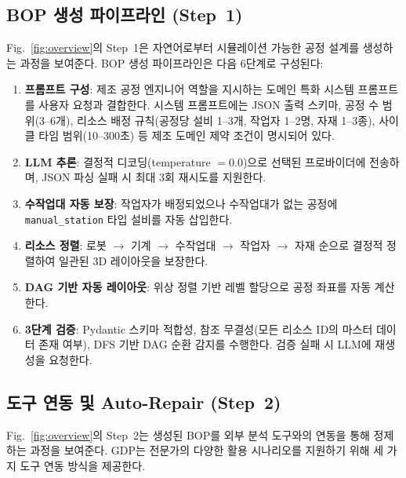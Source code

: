 \subsection{BOP 생성 파이프라인 (Step~1)}
\label{subsec:pipeline}

Fig.~\ref{fig:overview}의 Step~1은 자연어로부터 시뮬레이션 가능한 공정 설계를 생성하는 과정을 보여준다. BOP 생성 파이프라인은 다음 6단계로 구성된다:

\begin{enumerate}
    \item \textbf{프롬프트 구성}: 제조 공정 엔지니어 역할을 지시하는 도메인 특화 시스템 프롬프트를 사용자 요청과 결합한다. 시스템 프롬프트에는 JSON 출력 스키마, 공정 수 범위(3--6개), 리소스 배정 규칙(공정당 설비 1--3개, 작업자 1--2명, 자재 1--3종), 사이클 타임 범위(10--300초) 등 제조 도메인 제약 조건이 명시되어 있다.

    \item \textbf{LLM 추론}: 결정적 디코딩(temperature $= 0.0$)으로 선택된 프로바이더에 전송하며, JSON 파싱 실패 시 최대 3회 재시도를 지원한다.

    \item \textbf{수작업대 자동 보장}: 작업자가 배정되었으나 수작업대가 없는 공정에 \texttt{manual\_station} 타입 설비를 자동 삽입한다.

    \item \textbf{리소스 정렬}: 로봇 $\rightarrow$ 기계 $\rightarrow$ 수작업대 $\rightarrow$ 작업자 $\rightarrow$ 자재 순으로 결정적 정렬하여 일관된 3D 레이아웃을 보장한다.

    \item \textbf{DAG 기반 자동 레이아웃}: 위상 정렬 기반 레벨 할당으로 공정 좌표를 자동 계산한다.

    \item \textbf{3단계 검증}: Pydantic 스키마 적합성, 참조 무결성(모든 리소스 ID의 마스터 데이터 존재 여부), DFS 기반 DAG 순환 감지를 수행한다. 검증 실패 시 LLM에 재생성을 요청한다.
\end{enumerate}

\subsection{도구 연동 및 Auto-Repair (Step~2)}
\label{subsec:tools}

Fig.~\ref{fig:overview}의 Step~2는 생성된 BOP를 외부 분석 도구와의 연동을 통해 정제하는 과정을 보여준다. GDP는 전문가의 다양한 활용 시나리오를 지원하기 위해 세 가지 도구 연동 방식을 제공한다.

